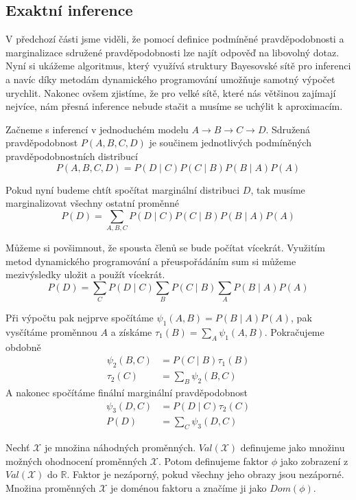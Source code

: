 \subsection{Exaktní inference}

V předchozí části jsme viděli, že pomocí definice podmíněné pravděpodobnosti a marginalizace sdružené pravděpodobnosti lze najít odpověď na libovolný dotaz. 
Nyní si ukážeme algoritmus, který využívá struktury Bayesovské sítě pro inferenci a navíc díky metodám dynamického programování umožňuje samotný výpočet urychlit.
Nakonec ovšem zjistíme, že pro velké sítě, které nás většinou zajímají nejvíce, nám přesná inference nebude stačit a musíme se uchýlit k aproximacím.

Začneme s inferencí v jednoduchém modelu $A \rightarrow B \rightarrow C \rightarrow D$.
Sdružená pravděpodobnost $P(A, B, C, D)$ je součinem jednotlivých podmíněných pravděpodobnostních distribucí
\begin{equation}
P(A, B, C, D) = P(D \mid C) P(C \mid B) P(B \mid A) P(A)
\end{equation}

Pokud nyní budeme chtít spočítat marginální distribuci $D$, tak musíme marginalizovat všechny ostatní proměnné
\begin{equation}
P(D) = \sum_{A, B, C} P(D \mid C) P(C \mid B) P(B \mid A) P(A)
\end{equation}

Můžeme si povšimnout, že spousta členů se bude počítat vícekrát.
Využitím metod dynamického programování a přeuspořádáním sum si můžeme mezivýsledky uložit a použít vícekrát.
\begin{equation}
P(D) = \sum_C P(D \mid C) \sum_B P(C \mid B) \sum_A P(B \mid A) P(A)
\end{equation}

Při výpočtu pak nejprve spočítáme $\psi_1(A, B) =  P(B \mid A) P(A)$,  pak vysčítáme proměnnou $A$ a získáme $\tau_1(B) = \sum_A \psi_1(A, B)$.
Pokračujeme obdobně
\begin{align}
    \psi_2(B, C) &= P(C \mid B) \tau_1(B) \\
    \tau_2(C) &= \sum_B \psi_2(B, C)
\end{align}
A nakonec spočítáme finální marginální pravděpodobnost
\begin{align}
    \psi_3(D, C) &= P(D \mid C) \tau_2(C) \\
    P(D) &= \sum_C \psi_3(D, C)
\end{align}

Nechť $\mathcal{X}$ je množina náhodných proměnných. 
$Val(\mathcal{X})$ definujeme jako množinu možných ohodnocení proměnných $\mathcal{X}$.
Potom definujeme faktor $\phi$ jako zobrazení z $Val(\mathcal{X})$ do $\mathbb{R}$. Faktor je nezáporný, pokud všechny jeho obrazy jsou nezáporné. Množina proměnných $\mathcal{X}$ je doménou faktoru a značíme ji jako $Dom(\phi)$.


